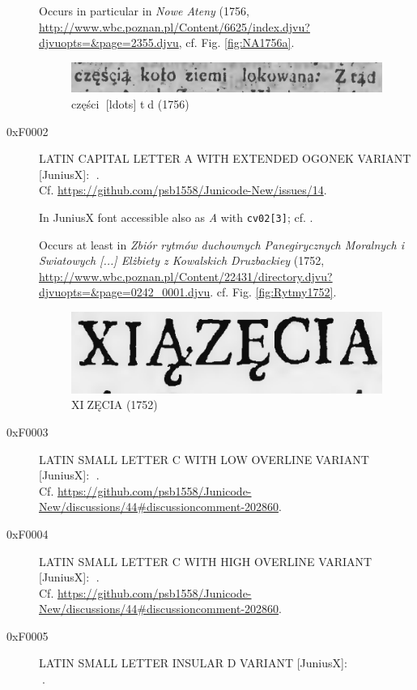 \documentclass{article}
\newcommand{\Jglyph}[1]{{\relsize{2}\J#1}}
\begin{document}
\begin{description}
  Occurs in particular in \textit{Nowe Ateny} (1756, \url{
    http://www.wbc.poznan.pl/Content/6625/index.djvu?djvuopts=&page=2355.djvu},
  cf. Fig. \vref{fig:NA1756a}.
 

  \begin{figure}[h]
    \includegraphics[width=1.3\textwidth]{img/00433254czescZtad.png}
    \caption{{\J części󰀁 [ldots] t󰀁d} (1756)}
    \label{fig:NA1756a}
  \end{figure}


\item [0xF0002] LATIN CAPITAL LETTER A WITH EXTENDED OGONEK VARIANT [JuniusX]: 
  \Jglyph{󰀂}.\\ Cf. \url{https://github.com/psb1558/Junicode-New/issues/14}.

  In JuniusX font accessible also as \textit{A} with \texttt{cv02[3]};
  cf. \autocite[p. 7]{baker20:_opent_featur_junius_junius}.


  Occurs at least in \textit{Zbiór rytmów duchownych Panegirycznych
    Moralnych i Swiatowych [...] Elżbiety z Kowalskich Druzbackiey}
  (1752,
  \url{http://www.wbc.poznan.pl/Content/22431/directory.djvu?djvuopts=&page=0242_0001.djvu}.
  cf. Fig. \vref{fig:Rytmy1752}.

  \begin{figure}[h]
    \includegraphics{img/00487576ksiazecia}
    \caption{{\J XI󰀂ZĘCIA} (1752)}
    \label{fig:Rytmy1752}
  \end{figure}
  
\item [0xF0003] LATIN SMALL LETTER C WITH LOW OVERLINE VARIANT [JuniusX]: 
  \Jglyph{󰀃}.\\ Cf. \url{https://github.com/psb1558/Junicode-New/discussions/44#discussioncomment-202860}.
\item [0xF0004] LATIN SMALL LETTER C WITH HIGH OVERLINE VARIANT [JuniusX]: 
  \Jglyph{󰀄}.\\ Cf. \url{https://github.com/psb1558/Junicode-New/discussions/44#discussioncomment-202860}.
\item [0xF0005] LATIN SMALL LETTER INSULAR D VARIANT [JuniusX]:\\
  \Jglyph{󰀅}.%


\end{description}
\end{document}
